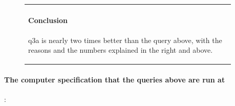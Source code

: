 \documentclass[10pt]{article}
\begin{document}
\begin{enumerate}
\begin{figure}[H]
\begin{minipage}[b]{0.55\linewidth}
\begin{tabular}{p{0.95\linewidth}}
						\paragraph{Conclusion} q3a is nearly two times better than the query above, with the reasons and the numbers explained in the right and above.
					\end{tabular}
				\end{minipage}
			\end{figure}
			
			\bigskip
			
			\paragraph{The computer specification that the queries above are run at}:
				\begin{table}[H]
					\bigskip
				\end{table}
			
			
			
			\clearpage
			

\end{enumerate}
\end{document}
